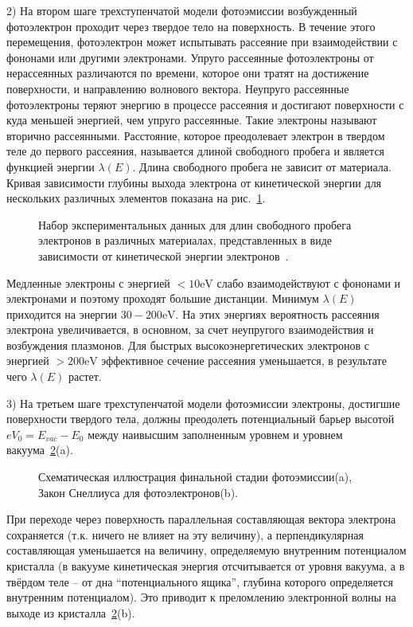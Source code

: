 2) На втором шаге трехступенчатой модели фотоэмиссии возбужденный
фотоэлектрон проходит через твердое тело на поверхность. В течение 
этого перемещения, фотоэлектрон может испытывать рассеяние при 
взаимодействии с фононами или другими электронами. Упруго рассеянные
фотоэлектроны от нерассеянных различаются по времени, которое они 
тратят на достижение поверхности, и направлению волнового вектора. 
Неупруго рассеянные фотоэлектроны теряют энергию в процессе рассеяния
и достигают поверхности с куда меньшей энергией, чем упруго рассеянные.
Такие электроны называют вторично рассеянными. 
Расстояние, которое преодолевает электрон в твердом теле до первого 
рассеяния, называется длиной свободного пробега и является функцией 
энергии $\lambda(E)$. Длина свободного пробега не зависит от материала.
Кривая зависимости глубины выхода электрона от кинетической энергии для нескольких различных элементов показана на рис.~\ref{pic:mean_free_path}.
	\begin{figure}[!ht]
		\caption{Набор экспериментальных данных для длин свободного пробега 
		электронов в различных материалах, представленных в виде зависимости 
		от кинетической энергии электронов~\cite{Mean_Free_Path}.}
		\label{pic:mean_free_path}
	\end{figure}
Медленные электроны с энергией $<10\si{\eV}$ слабо 
взаимодействуют с фононами и электронами и поэтому проходят большие
дистанции. Минимум $\lambda(E)$ приходится на энергии $30-200\si{\eV}$.
На этих энергиях вероятность рассеяния электрона увеличивается, в
основном, за счет неупругого взаимодействия и возбуждения плазмонов.
Для быстрых высокоэнергетических электронов с энергией $>200\si{\eV}$
эффективное сечение рассеяния уменьшается, в результате чего $\lambda(E)$ растет.


3) На третьем шаге трехступенчатой модели фотоэмиссии электроны,
достигшие поверхности твердого тела, должны преодолеть потенциальный
барьер высотой $eV_0=E_{vac}-E_0$ между наивысшим заполненным уровнем
и уровнем вакуума~\ref{pic:final_state_photoemission}(a). 
	\begin{figure}[!ht]
		\caption{Схематическая иллюстрация финальной стадии фотоэмиссии(a), 
		Закон Снеллиуса для фотоэлектронов(b).}
		\label{pic:final_state_photoemission}
	\end{figure}
При переходе через поверхность параллельная составляющая вектора 
электрона сохраняется (т.к. ничего не влияет на эту величину), а 
перпендикулярная составляющая уменьшается на величину, определяемую 
внутренним потенциалом кристалла (в вакууме кинетическая энергия 
отсчитывается от уровня вакуума, а в твёрдом теле -- от дна 
“потенциального ящика”, глубина которого определяется внутренним 
потенциалом). Это приводит к преломлению электронной волны на выходе 
из кристалла~\ref{pic:final_state_photoemission}(b).


